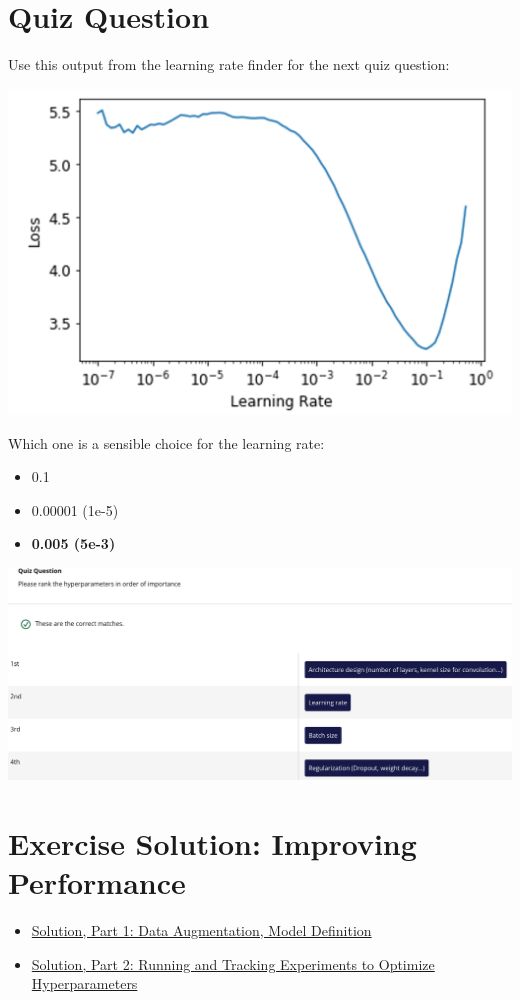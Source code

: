 \section{Quiz Question}
Use this output from the learning rate finder for the next quiz question:

\includegraphics[width=1\linewidth]{img//cnn//depth/lr-finderjty.jpeg}

Which one is a sensible choice for the learning rate:
\begin{itemize}
    \item 0.1
    \item 0.00001 (1e-5)
    \item \textbf{0.005 (5e-3)}
\end{itemize}

\includegraphics[width=1\linewidth]{img//cnn//depth/imagequiz.png}


\section{Exercise Solution: Improving Performance}
\begin{itemize}
    \item \href{https://www.youtube.com/watch?v=azxWs3Q9PN0&t=42s&ab_channel=Udacity}{Solution, Part 1: Data Augmentation, Model Definition}
    \item \href{https://www.youtube.com/watch?v=HWC4Rp0d29g&ab_channel=Udacity}{Solution, Part 2: Running and Tracking Experiments to Optimize Hyperparameters}
\end{itemize}


